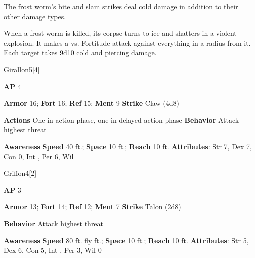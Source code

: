 The frost worm's bite and slam strikes deal cold damage in addition to their other damage types.

\vspace{0.5em}
When a frost worm is killed, its corpse turns to ice and shatters in a violent explosion.
It makes a  vs. Fortitude attack against everything in a \areahuge radius from it.
\hit Each target takes 9d10 cold and piercing damage.

\begin{monsection}{Girallon}{5}[4]
\vspace{-1em}\vspace{-1em}
\begin{spellcontent}
\begin{spelltargetinginfo}
{\textbf{AP} 4}

\pari \textbf{Armor} 16;
\textbf{Fort} 16;
\textbf{Ref} 15;
\textbf{Ment} 9
\pari \textbf{Strike} Claw  (4d8)


\pari \textbf{Actions} One in action phase, one in delayed action phase
\pari \textbf{Behavior} Attack highest threat
\end{spelltargetinginfo}
\end{spellcontent}

\begin{monsterfooter}
\pari \textbf{Awareness} 
\pari \textbf{Speed} 40 ft.;
\textbf{Space} 10 ft.;
\textbf{Reach} 10 ft.
\pari \textbf{Attributes}:
Str 7,
Dex 7,
Con 0,
Int ,
Per 6,
Wil 
\end{monsterfooter}
\end{monsection}

\begin{monsection}{Griffon}{4}[2]
\vspace{-1em}\vspace{-1em}
\begin{spellcontent}
\begin{spelltargetinginfo}
{\textbf{AP} 3}

\pari \textbf{Armor} 13;
\textbf{Fort} 14;
\textbf{Ref} 12;
\textbf{Ment} 7
\pari \textbf{Strike} Talon  (2d8)



\pari \textbf{Behavior} Attack highest threat
\end{spelltargetinginfo}
\end{spellcontent}

\begin{monsterfooter}
\pari \textbf{Awareness} 
\pari \textbf{Speed} 80 ft. fly ft.;
\textbf{Space} 10 ft.;
\textbf{Reach} 10 ft.
\pari \textbf{Attributes}:
Str 5,
Dex 6,
Con 5,
Int ,
Per 3,
Wil 0
\end{monsterfooter}
\end{monsection}


